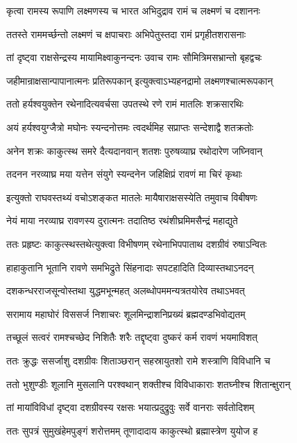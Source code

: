 \twolineshloka
{कृत्वा रामस्य रूपाणि लक्ष्मणस्य च भारत}
{अभिदुद्राव रामं च लक्ष्मणं च दशाननः}


\twolineshloka
{ततस्ते राममर्च्छन्तो लक्ष्मणं च क्षपाचराः}
{अभिपेतुस्तदा रामं प्रगृहीतशरासनाः}


\twolineshloka
{तां दृष्ट्वा राक्षसेन्द्रस्य मायामिक्ष्वाकुनन्दनः}
{उवाच रामः सौमित्रिमसभ्रान्तो बृहद्वचः}


\twolineshloka
{जहीमान्राक्षसान्पापानात्मनः प्रतिरूपकान्}
{इत्युक्त्वाऽभ्यहनद्रामो लक्ष्मणश्चात्मरूपकान्}


\twolineshloka
{ततो हर्यश्वयुक्तेन रथेनादित्यवर्चसा}
{उपतस्थे रणे रामं मातलिः शक्रसारथिः}



\twolineshloka
{अयं हर्यश्वयुग्जैत्रो मघोनः स्यन्दनोत्तमः}
{त्वदर्थमिह सप्राप्तः सन्देशाद्वै शतक्रतोः}


\twolineshloka
{अनेन शक्रः काकुत्स्थ समरे दैत्यदानवान्}
{शतशः पुरुषव्याघ्र रथोदारेण जघ्निवान्}


\twolineshloka
{तदनन नरव्याघ्र मया यत्तेन संयुगे}
{स्यन्दनेन जहिक्षिप्रं रावणं मा चिरं कृथाः}


\twolineshloka
{इत्युक्तो राघवस्तथ्यं वचोऽशङ्कत मातलेः}
{मायैषाराक्षसस्येति तमुवाच विबीषणः}


\twolineshloka
{नेयं माया नरव्याघ्र रावणस्य दुरात्मनः}
{तदातिष्ठ रथंशीघ्रमिमसैन्द्रं महाद्युते}


\twolineshloka
{ततः प्रहृष्टः काकुत्स्थस्तथेत्युक्त्वा विभीषणम्}
{रथेनाभिपपाताथ दशग्रीवं रुषाऽन्वितः}


\twolineshloka
{हाहाकुतानि भूतानि रावणे समभिद्रुते}
{सिंहनादाः सपटहादिति दिव्यास्तथाऽनदन्}


\twolineshloka
{दशकन्धरराजसून्वोस्तथा युद्धमभून्महत्}
{अलब्धोपममन्यत्रतयोरेव तथाऽभवत्}


\twolineshloka
{सरामाय महाघोरं विससर्ज निशाचरः}
{शूलमिन्द्राशनिप्रख्यं ब्रह्मदण्डभिवोद्यतम्}


\twolineshloka
{तच्छूलं सत्वरं रामश्चच्छेद निशितैः शरैः}
{तद्दृष्ट्वा दुष्करं कर्म रावणं भयमाविशत्}


\twolineshloka
{ततः क्रुद्धः ससर्जाशु दशग्रीवः शिताञ्छरान्}
{सहस्रायुतशो रामे शस्त्राणि विविधानि च}


\twolineshloka
{ततो भुशुण्डीः शूलानि मुसलानि परश्वथान्}
{शक्तीश्च विविधाकाराः शतघ्नीश्च शितान्क्षुरान्}


\twolineshloka
{तां मायांविविधां दृष्ट्वा दशग्रीवस्य रक्षसः}
{भयात्प्रदुद्रुवुः सर्वे वानराः सर्वतोदिशम्}


\twolineshloka
{ततः सुपत्रं सुमुखंहेमपुङ्गं शरोत्तमम्}
{तूणादादाय काकुत्स्थो ब्रह्मास्त्रेण युयोज ह}


